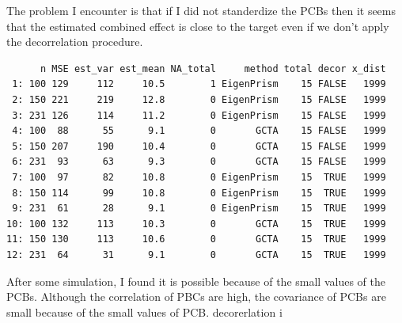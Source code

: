 \documentclass[]{article}
\begin{document}
The problem I encounter is that if I did not standerdize the PCBs then
it seems that the estimated combined effect is close to the target even
if we don't apply the decorrelation procedure.

\begin{verbatim}
      n MSE est_var est_mean NA_total     method total decor x_dist
 1: 100 129     112     10.5        1 EigenPrism    15 FALSE   1999
 2: 150 221     219     12.8        0 EigenPrism    15 FALSE   1999
 3: 231 126     114     11.2        0 EigenPrism    15 FALSE   1999
 4: 100  88      55      9.1        0       GCTA    15 FALSE   1999
 5: 150 207     190     10.4        0       GCTA    15 FALSE   1999
 6: 231  93      63      9.3        0       GCTA    15 FALSE   1999
 7: 100  97      82     10.8        0 EigenPrism    15  TRUE   1999
 8: 150 114      99     10.8        0 EigenPrism    15  TRUE   1999
 9: 231  61      28      9.1        0 EigenPrism    15  TRUE   1999
10: 100 132     113     10.3        0       GCTA    15  TRUE   1999
11: 150 130     113     10.6        0       GCTA    15  TRUE   1999
12: 231  64      31      9.1        0       GCTA    15  TRUE   1999
\end{verbatim}

After some simulation, I found it is possible because of the small
values of the PCBs. Although the correlation of PBCs are high, the
covariance of PCBs are small because of the small values of PCB.
decorerlation i
\end{document}
